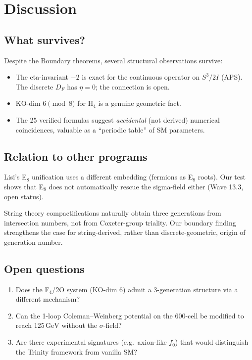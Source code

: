 \documentclass[11pt,a4paper]{article}
\theoremstyle{definition}
\begin{document}
\section{Discussion}\label{sec:discussion}

\subsection{What survives?}

Despite the Boundary theorems, several structural observations survive:
\begin{itemize}
  \item The eta-invariant $-2$ is exact for the continuous operator on $S^3/2I$ (APS). The discrete $D_F$ has $\eta=0$; the connection is open.
  \item KO-dim $6 \pmod 8$ for H$_4$ is a genuine geometric fact.
  \item The 25 verified formulas suggest \emph{accidental} (not derived)
    numerical coincidences, valuable as a ``periodic table'' of SM
    parameters.
\end{itemize}

\subsection{Relation to other programs}

Lisi's E$_8$ unification \cite{Lisi:2007} uses a different embedding
(fermions as E$_8$ roots). Our test shows that E$_8$ does not
automatically rescue the sigma-field either (Wave 13.3, open status).

String theory compactifications naturally obtain three generations from
intersection numbers, not from Coxeter-group triality. Our boundary finding
strengthens the case for string-derived, rather than discrete-geometric,
origin of generation number.

\subsection{Open questions}

\begin{enumerate}
  \item Does the F$_4$/2O system (KO-dim $6$) admit a 3-generation structure
    via a different mechanism?
  \item Can the 1-loop Coleman--Weinberg potential on the 600-cell be
    modified to reach $125\,\text{GeV}$ without the $\sigma$-field?
  \item Are there experimental signatures (e.g.~axion-like $f_0$) that
    would distinguish the Trinity framework from vanilla SM?
\end{enumerate}
\end{document}
